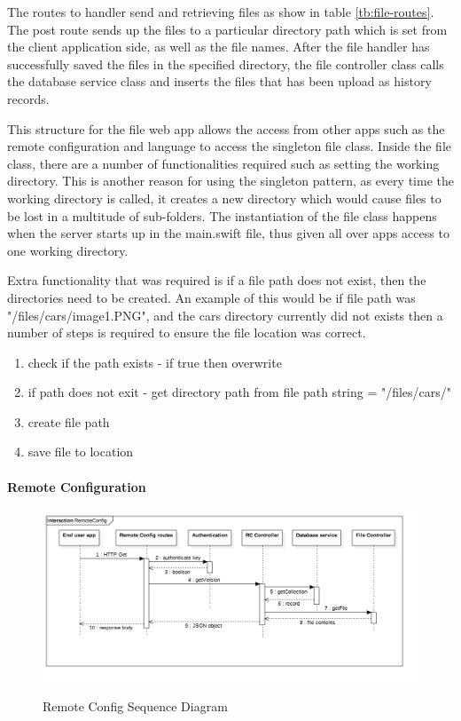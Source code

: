The routes to handler send and retrieving files as show in table \ref{tb:file-routes}. The post route sends up the files to a particular directory path which is set from the client application side, as well as the file names. After the file handler has successfully saved the files in the specified directory, the file controller class calls the database service class and inserts the files that has been upload as history records. 

This structure for the file web app allows the access from other apps such as the remote configuration and language to access the singleton file class. Inside the file class, there are a number of functionalities required such as setting the working directory. This is another reason for using the singleton pattern, as every time the working directory is called, it creates a new directory which would cause files to be lost in a multitude of sub-folders. The instantiation of the file class happens when the server starts up in the main.swift file, thus given all over apps access to one working directory.

Extra functionality that was required is if a file path does not exist, then the directories need to be created. An example of this would be if file path was "/files/cars/image1.PNG", and the cars directory currently did not exists then a number of steps is required to ensure the file location was correct.

\begin{enumerate}
  \item check if the path exists
  - if true then overwrite 
  \item if path does not exit
  - get directory path from file path string = "/files/cars/" 
  \item create file path
  \item save file to location
\end{enumerate}


\paragraph{Remote Configuration}

\begin{figure}[!h]
    \caption{Remote Config Sequence Diagram}
    \centering
    \includegraphics[width=150mm]{images/sequence/RemoteConfig}
    \label{fig:rc-seq}
\end{figure}

